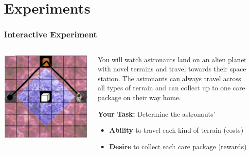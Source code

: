 \documentclass{beamer}
\begin{document}
\section{Experiments}

\begin{frame}
\frametitle{Interactive Experiment}
\begin{columns}
\begin{column}{0.4\textwidth}
\begin{center}
\includegraphics[width=\textwidth]{experiment_1a-1.png}
\end{center}
\end{column}
\begin{column}{0.6\textwidth}
You will watch astronauts land on an alien planet with novel terrains and travel towards their space station. The astronauts can always travel across all types of terrain and can collect up to one care package on their way home.

\vspace{0.5cm}
\textbf{Your Task:} Determine the astronauts'
\begin{itemize}
    \item \textbf{Ability} to travel each kind of terrain (costs)
    \item \textbf{Desire} to collect each care package (rewards)
\end{itemize}
\end{column}
\end{columns}
\end{frame}
\end{document}
